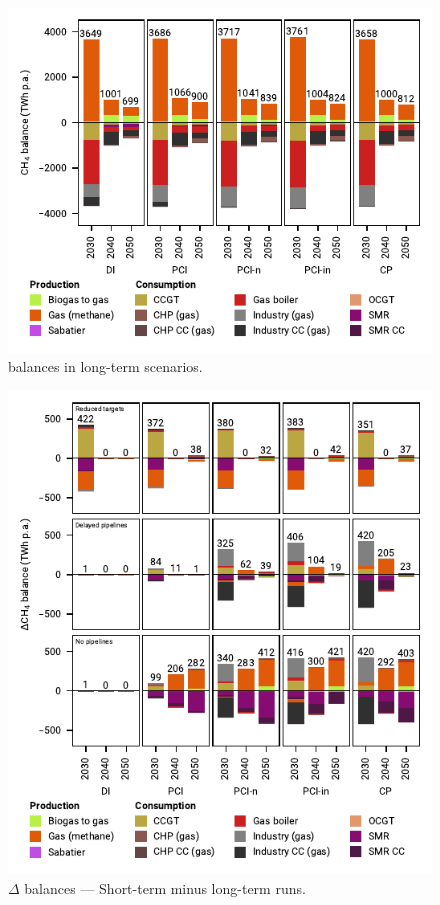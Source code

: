 \documentclass[preprint,12pt,sort&compress]{elsarticle}
\begin{document}
\begin{figure}[htbp]
  \centering
  \includegraphics[width=\linewidth]{balances_overview_gas}
  \caption{ balances in long-term scenarios.}
  \label{fig:balances_overview_gas}
\end{figure}

\begin{figure}[htbp]
  \centering
  \includegraphics[width=\linewidth]{balances_overview_extended_gas}
  \caption{$\Delta$ balances --- Short-term minus long-term runs.}
  \label{fig:balances_overview_extended_gas}
\end{figure}
\end{document}
